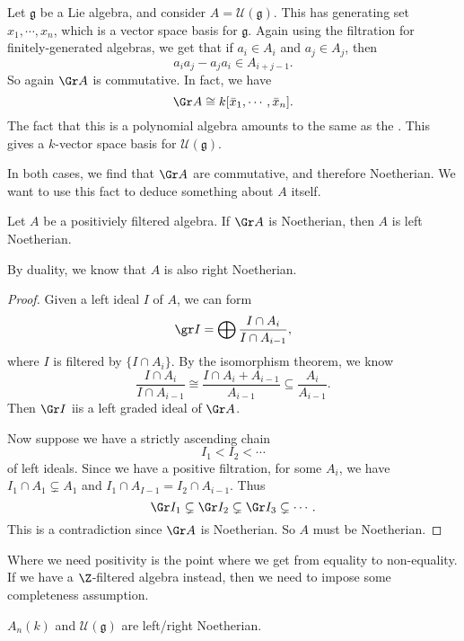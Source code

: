 \documentclass[a4paper]{article}
\begin{document}
\begin{eg}
  Let $\mathfrak{g}$ be a Lie algebra, and consider $A = \mathcal{U}(\mathfrak{g})$. This has generating set $x_1, \cdots, x_n$, which is a vector space basis for $\mathfrak{g}$. Again using the filtration for finitely-generated algebras, we get that if $a_i \in A_i$ and $a_j \in A_j$, then
  \[
    a_i a_j - a_j a_i \in A_{i + j - 1}.
  \]
  So again $\Gr A$ is commutative. In fact, we have
  \[
    \Gr A \cong k[\bar{x}_1, \cdots, \bar{x}_n].
  \]
  The fact that this is a polynomial algebra amounts to the same as the . This gives a $k$-vector space basis for $\mathcal{U}(\mathfrak{g})$.
\end{eg}

In both cases, we find that $\Gr A$ are commutative, and therefore Noetherian. We want to use this fact to deduce something about $A$ itself.

\begin{lemma}
  Let $A$ be a positiviely filtered algebra. If $\Gr A$ is Noetherian, then $A$ is left Noetherian.
\end{lemma}
By duality, we know that $A$ is also right Noetherian.

\begin{proof}
  Given a left ideal $I$ of $A$, we can form
  \[
    \gr I = \bigoplus \frac{I \cap A_i}{I \cap A_{i - 1}},
  \]
  where $I$ is filtered by $\{I \cap A_i\}$. By the isomorphism theorem, we know
  \[
    \frac{I \cap A_i}{I \cap A_{i - 1}} \cong \frac{I \cap A_i + A_{i - 1}}{A_{i - 1}} \subseteq \frac{A_i}{A_{i - 1}}.
  \]
  Then $\Gr I$ iis a left graded ideal of $\Gr A$.

  Now suppose we have a strictly ascending chain
  \[
    I_1 < I_2 < \cdots
  \]
  of left ideals. Since we have a positive filtration, for some $A_i$, we have $I_1 \cap A_1 \subsetneq A_1$ and $I_1 \cap A_{I - 1} = I_2 \cap A_{i - 1}$. Thus
  \[
    \Gr I_1 \subsetneq \Gr I_2 \subsetneq \Gr I_3 \subsetneq \cdots.
  \]
  This is a contradiction since $\Gr A$ is Noetherian. So $A$ must be Noetherian.
\end{proof}
Where we need positivity is the point where we get from equality to non-equality. If we have a $\Z$-filtered algebra instead, then we need to impose some completeness assumption.

\begin{cor}
  $A_n(k)$ and $\mathcal{U}(\mathfrak{g})$ are left/right Noetherian.
\end{cor}
\end{document}
